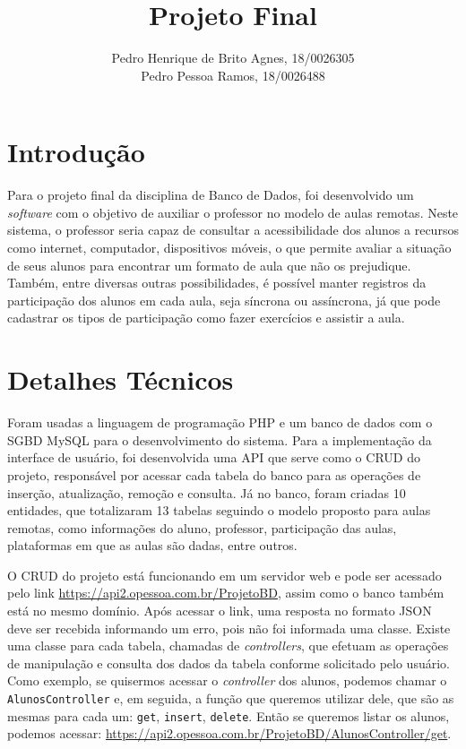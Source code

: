\documentclass[12pt]{article}
\title{Projeto Final}
\author{Pedro Henrique de Brito Agnes, 18/0026305 \\
Pedro Pessoa Ramos, 18/0026488}
\date{}
\begin{document}
 
\maketitle

\section*{Introdução}
Para o projeto final da disciplina de Banco de Dados, foi desenvolvido um \textit{software} com o objetivo de auxiliar o professor no modelo de aulas remotas. Neste sistema, o professor seria capaz de consultar a acessibilidade dos alunos a recursos como internet, computador, dispositivos móveis, o que permite avaliar a situação de seus alunos para encontrar um formato de aula que não os prejudique. Também, entre diversas outras possibilidades, é possível manter registros da participação dos alunos em cada aula, seja síncrona ou assíncrona, já que pode cadastrar os tipos de participação como fazer exercícios e assistir a aula.

\section*{Detalhes Técnicos}
Foram usadas a linguagem de programação PHP e um banco de dados com o SGBD MySQL para o desenvolvimento do sistema. Para a implementação da interface de usuário, foi desenvolvida uma API que serve como o CRUD do projeto, responsável por acessar cada tabela do banco para as operações de inserção, atualização, remoção e consulta. Já no banco, foram criadas 10 entidades, que totalizaram 13 tabelas seguindo o modelo proposto para aulas remotas, como informações do aluno, professor, participação das aulas, plataformas em que as aulas são dadas, entre outros.

O CRUD do projeto está funcionando em um servidor web e pode ser acessado pelo link \url{https://api2.opessoa.com.br/ProjetoBD}, assim como o banco também está no mesmo domínio. Após acessar o link, uma resposta no formato JSON deve ser recebida informando um erro, pois não foi informada uma classe. Existe uma classe para cada tabela, chamadas de \textit{controllers}, que efetuam as operações de manipulação e consulta dos dados da tabela conforme solicitado pelo usuário. Como exemplo, se quisermos acessar o \textit{controller} dos alunos, podemos chamar o \texttt{AlunosController} e, em seguida, a função que queremos utilizar dele, que são as mesmas para cada um: \texttt{get}, \texttt{insert}, \texttt{delete}. Então se queremos listar os alunos, podemos acessar: \url{https://api2.opessoa.com.br/ProjetoBD/AlunosController/get}.
\end{document}
